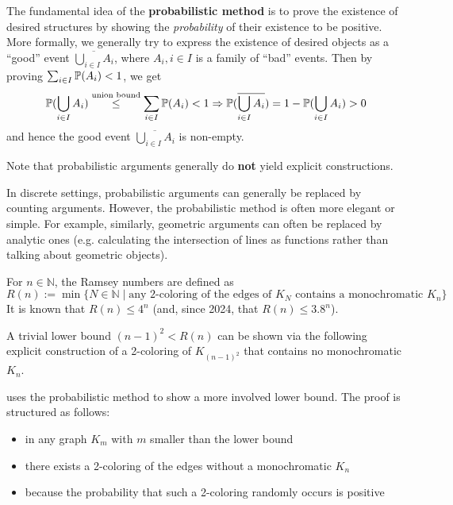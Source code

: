 \documentclass[../main.tex]{subfiles}
\begin{document}
The fundamental idea of the \textbf{probabilistic method} is to prove the existence of desired structures by showing the \textit{probability} of their existence to be positive. More formally, we generally try to express the existence of desired objects as a \enquote{good} event $\overline{\bigcup_{i \in I} A_i}$, where $A_i, i \in I$ is a family of \enquote{bad} events. Then by proving $\sum_{i \in I} \mathbb{P}(A_i) < 1$, we get
\begin{equation}\label{eq:prob}
	\mathbb{P}(\bigcup_{i \in I} A_i) \overset{\text{union bound}}{\leq} \sum_{i \in I} \mathbb{P}(A_i) < 1 \Rightarrow \mathbb{P}(\overline{\bigcup_{i \in I} A_i}) = 1 - \mathbb{P}(\bigcup_{i \in I} A_i) > 0
\end{equation}
and hence the good event $\overline{\bigcup_{i \in I} A_i}$ is non-empty.

\begin{remark}
	Note that probabilistic arguments generally do \textbf{not} yield explicit constructions.
\end{remark}

\begin{remark}
	In discrete settings, probabilistic arguments can generally be replaced by counting arguments. However, the probabilistic method is often more elegant or simple. For example, similarly, geometric arguments can often be replaced by analytic ones (e.g. calculating the intersection of lines as functions rather than talking about geometric objects).
\end{remark}

\begin{example}
	For $n \in \mathbb{N}$, the Ramsey numbers are defined as 
	$$R(n) := \min\{N \in \mathbb{N} \mid \text{any 2-coloring of the edges of } K_N \text{ contains a monochromatic } K_n\}$$
	It is known that $R(n) \leq 4^n$ (and, since 2024, that $R(n) \leq 3.8^n$).
	
	A trivial lower bound $(n-1)^2 < R(n)$ can be shown via the following explicit construction of a 2-coloring of $K_{(n-1)^2}$ that contains no monochromatic $K_n$. \TODO{\textcolor{red}{image}}
	
	 uses the probabilistic method to show a more involved lower bound. The proof is structured as follows:
	\bgroup
	\begin{itemize}
		\item in any graph $K_m$ with $m$ smaller than the lower bound
		\item there exists a 2-coloring of the edges without a monochromatic $K_n$
		\item because the probability that such a 2-coloring randomly occurs is positive
	\end{itemize}
	\egroup
\end{example}
\end{document}
